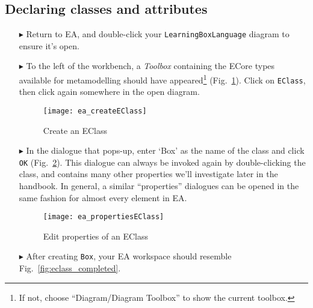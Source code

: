 \newpage
\subsection{Declaring classes and attributes}
\visHeader
\hypertarget{static:classes vis}{}

\begin{itemize}

\item[$\blacktriangleright$] Return to EA, and double-click your \texttt{LearningBoxLanguage} diagram to ensure it's open.

\vspace{0.5cm}

\item[$\blacktriangleright$] To the left of the workbench, a \emph{Toolbox} containing the ECore types available for metamodelling should have
appeared\footnote{If not, choose ``Diagram/Diagram Toolbox'' to show the current toolbox.} (Fig.~\ref{fig:eclass}). Click on \texttt{EClass}, then click again
somewhere in the open diagram.

\vspace{0.5cm}

\begin{figure}[htbp]
	\centering
  \texttt{[image: ea\_createEClass]}
	\caption{Create an EClass}
	\label{fig:eclass}
\end{figure}

\vspace{0.5cm}

\item[$\blacktriangleright$] In the dialogue that pops-up, enter `Box' as the name of the class and click \texttt{OK} (Fig.~\ref{fig:eclass_properties}).
This dialogue can always be invoked again by double-clicking the class, and contains many other properties we'll investigate later in the handbook.
In general, a similar ``properties'' dialogues can be opened in the same fashion for almost every element in EA.

\begin{figure}[ht]
	\centering
  \texttt{[image: ea\_propertiesEClass]}
	\caption{Edit properties of an EClass}
	\label{fig:eclass_properties}
\end{figure}

\newpage

\item[$\blacktriangleright$] After creating \texttt{Box}, your EA workspace should resemble Fig.~\ref{fig:eclass_completed}.


\end{itemize}
